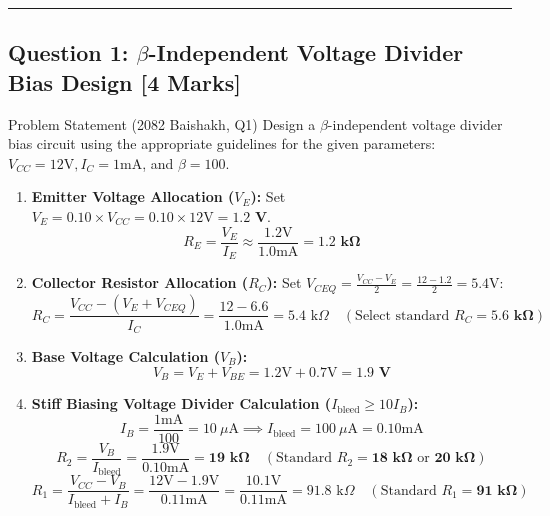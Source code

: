 \documentclass[11pt,a4paper,oneside]{book}
\begin{document}
\vspace{0.6cm}
\hrule
\vspace{0.6cm}

\subsection{Question 1: $\beta$-Independent Voltage Divider Bias Design [4 Marks]}
\begin{questionbox}{Problem Statement (2082 Baishakh, Q1)}
Design a $\beta$-independent voltage divider bias circuit using the appropriate guidelines for the given parameters: $V_{CC} = 12\text{V}, I_C = 1\text{mA}$, and $\beta = 100$.
\end{questionbox}

\begin{enumerate}[leftmargin=1.5em]
  \item \textbf{Emitter Voltage Allocation ($V_E$):}
  Set $V_E = 0.10 \times V_{CC} = 0.10 \times 12\text{V} = \mathbf{1.2\text{ V}}$.
  \[
  R_E = \frac{V_E}{I_E} \approx \frac{1.2\text{V}}{1.0\text{mA}} = \mathbf{1.2\text{ k}\Omega}
  \]
  \item \textbf{Collector Resistor Allocation ($R_C$):}
  Set $V_{CEQ} = \frac{V_{CC} - V_E}{2} = \frac{12 - 1.2}{2} = 5.4\text{V}$:
  \[
  R_C = \frac{V_{CC} - (V_E + V_{CEQ})}{I_C} = \frac{12 - 6.6}{1.0\text{mA}} = 5.4\text{ k}\Omega \quad (\text{Select standard } R_C = \mathbf{5.6\text{ k}\Omega})
  \]
  \item \textbf{Base Voltage Calculation ($V_B$):}
  \[
  V_B = V_E + V_{BE} = 1.2\text{V} + 0.7\text{V} = \mathbf{1.9\text{ V}}
  \]
  \item \textbf{Stiff Biasing Voltage Divider Calculation ($I_{\text{bleed}} \ge 10 I_B$):}
  \[
  I_B = \frac{1\text{mA}}{100} = 10\ \mu\text{A} \implies I_{\text{bleed}} = 100\ \mu\text{A} = 0.10\text{mA}
  \]
  \[
  R_2 = \frac{V_B}{I_{\text{bleed}}} = \frac{1.9\text{V}}{0.10\text{mA}} = \mathbf{19\text{ k}\Omega} \quad (\text{Standard } R_2 = \mathbf{18\text{ k}\Omega}\text{ or } \mathbf{20\text{ k}\Omega})
  \]
  \[
  R_1 = \frac{V_{CC} - V_B}{I_{\text{bleed}} + I_B} = \frac{12\text{V} - 1.9\text{V}}{0.11\text{mA}} = \frac{10.1\text{V}}{0.11\text{mA}} = 91.8\text{ k}\Omega \quad (\text{Standard } R_1 = \mathbf{91\text{ k}\Omega})
  \]
\end{enumerate}
\end{document}
